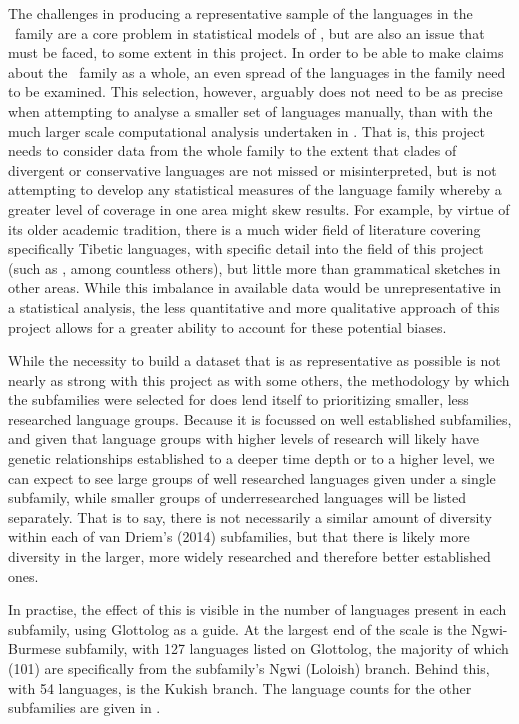 The challenges in producing a representative sample of the languages in the \lfam\ family are a core problem in statistical models of , but are also an issue that must be faced, to some extent in this project. In order to be able to make claims about the \lfam\ family as a whole, an even spread of the languages in the family need to be examined. This selection, however, arguably does not need to be as precise when attempting to analyse a smaller set of languages manually, than with the much larger scale computational analysis undertaken in . That is, this project needs to consider data from the whole family to the extent that clades of divergent or conservative languages are not missed or misinterpreted, but is not attempting to develop any statistical measures of the language family whereby a greater level of coverage in one area might skew results. For example, by virtue of its older academic tradition, there is a much wider field of literature covering specifically Tibetic languages, with specific detail into the field of this project (such as , among countless others), but little more than grammatical sketches in other areas. While this imbalance in available data would be unrepresentative in a statistical analysis, the less quantitative and more qualitative approach of this project allows for a greater ability to account for these potential biases.

While the necessity to build a dataset that is as representative as possible is not nearly as strong with this project as with some others, the methodology by which the subfamilies were selected for  does lend itself to prioritizing smaller, less researched language groups. Because it is focussed on well established subfamilies, and given that language groups with higher levels of research will likely have genetic relationships established to a deeper time depth or to a higher level, we can expect to see large groups of well researched languages given under a single subfamily, while smaller groups of underresearched languages will be listed separately. That is to say, there is not necessarily a similar amount of diversity within each of van Driem's (2014) subfamilies, but that there is likely more diversity in the larger, more widely researched and therefore better established ones.

In practise, the effect of this is visible in the number of languages present in each subfamily, using Glottolog \cite{glottolog} as a guide. At the largest end of the scale is the Ngwi-Burmese subfamily, with 127 languages listed on Glottolog, the majority of which (101) are specifically from the subfamily's Ngwi (Loloish) branch. Behind this, with 54 languages, is the Kukish branch. The language counts for the other subfamilies are given in .

